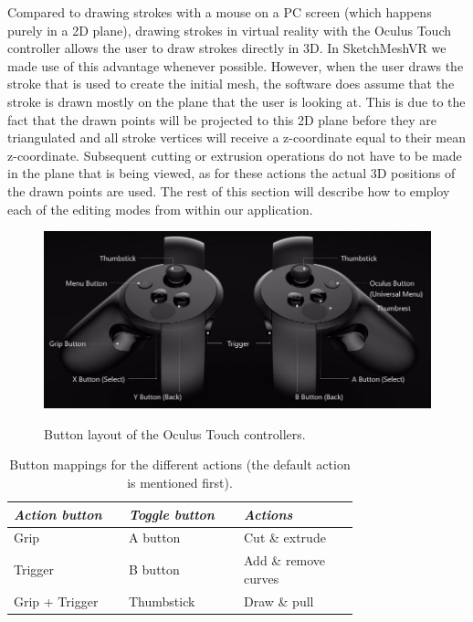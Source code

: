Compared to drawing strokes with a mouse on a PC screen (which happens purely in a 2D plane), drawing strokes in virtual reality with the Oculus Touch controller allows the user to draw strokes directly in 3D. In SketchMeshVR we made use of this advantage whenever possible. However, when the user draws the stroke that is used to create the initial mesh, the software does assume that the stroke is drawn mostly on the plane that the user is looking at. This is due to the fact that the drawn points will be projected to this 2D plane before they are triangulated and all stroke vertices will receive a z-coordinate equal to their mean z-coordinate. Subsequent cutting or extrusion operations do not have to be made in the plane that is being viewed, as for these actions the actual 3D positions of the drawn points are used. The rest of this section will describe how to employ each of the editing modes from within our application.

\begin{figure}[!h]
    \centering
    \includegraphics[width=0.7260\linewidth]{figures/touch_controllers}\\
    \caption[Oculus Touch controllers]{Button layout of the Oculus Touch controllers.
      \label{fig:touch_controller}}
\end{figure}

\begin{table}
    \centering
    \begin{tabular}{p{0.25\linewidth}p{0.25\linewidth}p{0.25\linewidth}}
    \toprule
    \emph{Action button} & \emph{Toggle button} & \emph{Actions}\\
    \midrule
		Grip & A button &Cut \& extrude\\
		Trigger  &B button &Add \& remove curves\\
		Grip + Trigger  &Thumbstick &Draw \& pull\\
    \bottomrule
    \end{tabular}
    \caption[Button mappings]{Button mappings for the different actions (the default action is mentioned first).\label{tab:buttonmap}}
\end{table}


